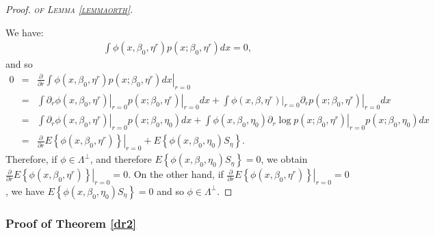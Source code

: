 \documentclass[11pt]{article}
\newcommand{\eqnn}{\begin{eqnarray*}}
\newcommand{\een}{\end{eqnarray*}}
\begin{document}
\newenvironment{newproof10}{\begin{proof}\textsc{\emph{of Lemma \ref{lemmaorth}.}}}{\end{proof}}

\begin{newproof10}

We have:
\eqnn
\int \phi(x, \beta_0, \eta^r) p(x ; \beta_0, \eta^r)dx=0,
\een
and so
\eqnn
0&=&\left.\frac{\partial}{\partial r} \int \phi(x, \beta_0, \eta^r) p(x ; \beta_0, \eta^r)dx \right|_{r=0}\\
&=&\int \left.\partial_r\phi(x,\beta_0, \eta^r)\right|_{r=0} \left.p(x ; \beta_0, \eta^r)\right|_{r=0}dx+\int \left.\phi(x, \beta, \eta^r)\right|_{r=0} \left.\partial_r p(x ;\beta_0, \eta^r)\right|_{r=0}dx\\
&=&\int \left.\partial_r\phi(x, \beta_0, \eta^r)\right|_{r=0} p(x ; \beta_0, \eta_0)dx+\int\phi(x, \beta_0, \eta_0) \partial_r\left.\log p(x ; \beta_0, \eta^r)\right|_{r=0} p(x ; \beta_0, \eta_0)dx\\
&=&\frac{\partial}{\partial r} E\left.\left\{\phi(x, \beta_0, \eta^r)\right\}\right|_{r=0}+E\left\{\phi(x, \beta_0, \eta_0) S_\eta \right\}.
\een
Therefore, if $\phi \in \Lambda^\perp$, and therefore $E \left\{\phi(x, \beta_0, \eta_0) S_\eta \right\}=0$, we obtain $\frac{\partial}{\partial r}E\left.\left\{\phi(x, \beta_0, \eta^r)\right\}\right|_{r=0}=0$.
On the other hand, if $\frac{\partial}{\partial r} E\left.\left\{\phi(x, \beta_0, \eta^r)\right\}\right|_{r=0}=0$, we have $E \left\{\phi(x, \beta_0, \eta_0) S_\eta \right\}=0$ and so $\phi \in \Lambda^\perp$.
\end{newproof10}




\subsubsection{Proof of Theorem \ref{dr2}} %
\end{document}
